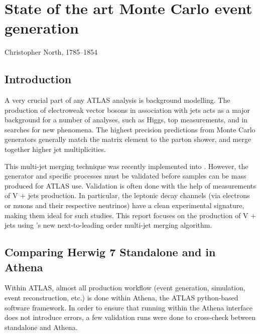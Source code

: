 \chapter{State of the art Monte Carlo event generation}
\label{chap:SomeStuff}



%
{Christopher North, 1785--1854}%

\section{Introduction}
A very crucial part of any ATLAS analysis is background modelling. The production of electroweak vector bosons in association with jets acts as a major background for a number of analyses, such as Higgs, top measurements, and in searches for new phenomena. The highest precision predictions from Monte Carlo generators generally match the matrix element to the parton shower, and merge together higher jet multiplicities. 

This multi-jet merging technique was recently implemented into . However, the generator and specific processes must be validated before samples can be mass produced for ATLAS use. Validation is often done with the help of measurements of V + jets production. In particular, the leptonic decay channels (via electrons or muons and their respective neutrinos) have a clean experimental signature, making them ideal for such studies. This report focuses on the production of V + jets using 's new next-to-leading order multi-jet merging algorithm.

\section{Comparing Herwig 7 Standalone and in Athena}
\noindent
Within ATLAS, almost all production workflow (event generation, simulation, event reconstruction, etc.) is done within Athena, the ATLAS python-based software framework. In order to ensure that running  within the Athena interface does not introduce errors, a few validation runs were done to cross-check between  standalone and Athena. 


